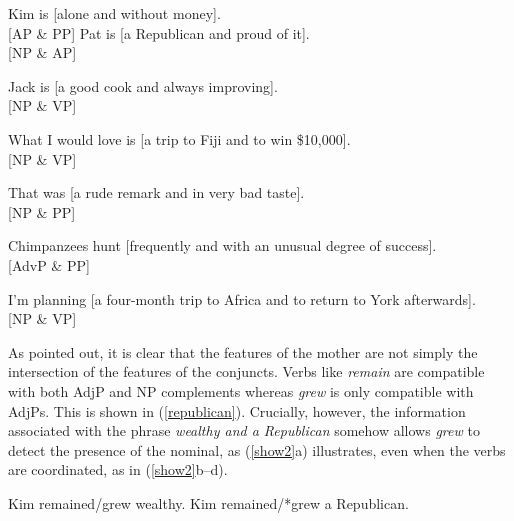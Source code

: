 \documentclass[output=paper
                ,modfonts
                ,nonflat
	        ,collection
	        ,collectionchapter
	        ,collectiontoclongg
 	        ,biblatex
                ,babelshorthands
                ,newtxmath
                ,draftmode
                ,colorlinks, citecolor=brown
]{./langsci/langscibook}
\begin{document}
{
\begin{exe}
\ex \begin{xlista}
\ex Kim is  [alone and without money].\\
 \hfill [AP \& PP]
\ex  Pat is [a Republican and proud of it]. \\
 \hfill [NP \& AP]

\ex  Jack is [a good cook and always improving].\\ \hfill [NP \& VP]

\ex What I would love is [a trip to Fiji and to win \$10,000].\\
\hfill [NP \& VP]

\ex  That was [a rude remark and in very bad taste]. \\
\hfill [NP \& PP]

\ex Chimpanzees hunt [frequently and with an unusual degree of success].\\
\hfill [AdvP \& PP]

\ex I'm  planning [a four-month trip to Africa and  to return to York afterwards].\\
\hfill [NP \& VP]
 \end{xlista}\label{unlk1}
\end{exe}


\noindent
As  \citet{jacobson} pointed out, it is clear that the features of the mother are not simply the intersection of the features of the conjuncts. Verbs like \emph{remain} are compatible with both
AdjP and NP complements whereas \emph{grew}
is only compatible with AdjPs.
This is shown in  (\ref{republican}).
Crucially, however, the information associated with
the phrase \emph{wealthy and a Republican}
somehow allows \emph{grew} to detect the presence of
the nominal, as (\ref{show2}a) illustrates, even
when the verbs
are coordinated, as in (\ref{show2}b--d).


\begin{exe}
\ex
\begin{xlista}
\ex  Kim remained/grew wealthy.
\ex  Kim remained/*grew a Republican.
\end{xlista}\label{republican}
\end{exe}



}
\end{document}

